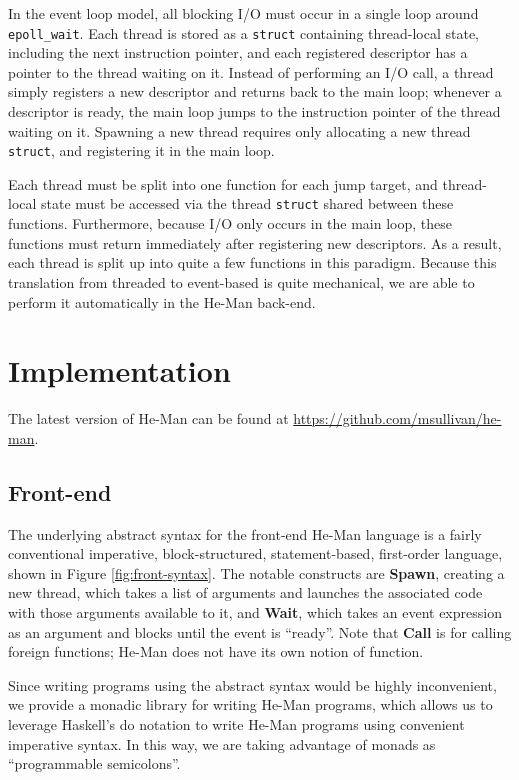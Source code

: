 \documentclass[preprint]{sigplanconf}
\renewcommand{\t}{\texttt}
\renewcommand{\b}{\textbf}
\begin{document}
In the event loop model, all blocking I/O must occur in a single loop around
\t{epoll\_wait}. Each thread is stored as a \t{struct} containing thread-local
state, including the next instruction pointer, and each registered descriptor
has a pointer to the thread waiting on it. Instead of performing an I/O call, a
thread simply registers a new descriptor and returns back to the main loop;
whenever a descriptor is ready, the main loop jumps to the instruction pointer
of the thread waiting on it. Spawning a new thread requires only allocating a
new thread \t{struct}, and registering it in the main loop.

Each thread must be split into one function for each jump target, and
thread-local state must be accessed via the thread \t{struct} shared between
these functions. Furthermore, because I/O only occurs in the main loop, these
functions must return immediately after registering new descriptors. As a
result, each thread is split up into quite a few functions in this paradigm.
Because this translation from threaded to event-based is quite mechanical, we
are able to perform it automatically in the He-Man back-end.

\section{Implementation}

The latest version of He-Man can be found at
\url{https://github.com/msullivan/he-man}.

\subsection{Front-end}

The underlying abstract syntax for the front-end He-Man language is a
fairly conventional imperative, block-structured, statement-based,
first-order language, shown in Figure \ref{fig:front-syntax}. The
notable constructs are \b{Spawn}, creating a new thread, which takes a
list of arguments and launches the associated code with those
arguments available to it, and \b{Wait}, which takes an event
expression as an argument and blocks until the event is
``ready''. Note that \b{Call} is for calling foreign functions; He-Man
does not have its own notion of function.

Since writing programs using the abstract syntax would be highly
inconvenient, we provide a monadic library for writing He-Man
programs, which allows us to leverage Haskell's do notation to write
He-Man programs using convenient imperative syntax. In this way, we
are taking advantage of monads as ``programmable semicolons''.
\end{document}
